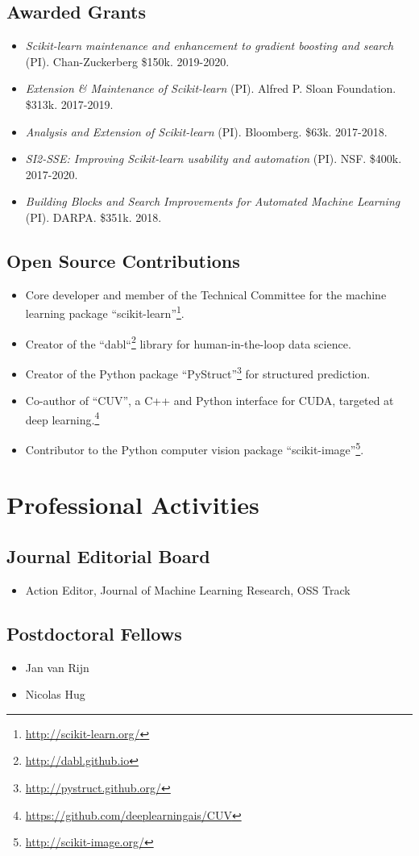 \documentclass[a4paper,9pt]{article}
\begin{document}
\subsection{Awarded Grants}
\begin{itemize}
    \item \emph{Scikit-learn maintenance and enhancement to gradient boosting and search} (PI). Chan-Zuckerberg \$150k. 2019-2020.
    \item \emph{Extension \& Maintenance of Scikit-learn} (PI). Alfred P. Sloan Foundation. \$313k. 2017-2019.
    \item \emph{Analysis and Extension of Scikit-learn} (PI). Bloomberg. \$63k. 2017-2018.
    \item \emph{SI2-SSE: Improving Scikit-learn usability and automation} (PI). NSF. \$400k. 2017-2020.
    \item \emph{Building Blocks and Search Improvements for Automated Machine Learning} (PI). DARPA. \$351k. 2018.
\end{itemize}

\subsection{Open Source Contributions}
\begin{itemize}
    \item Core developer and member of the Technical Committee for the machine learning package ``scikit-learn''\footnote{\url{http://scikit-learn.org/}}.
    \item Creator of the ``dabl``\footnote{\url{http://dabl.github.io}} library for human-in-the-loop data science.
    \item Creator of the Python package ``PyStruct''\footnote{\url{http://pystruct.github.org/}} for structured prediction.
    \item Co-author of ``CUV'', a C++ and Python interface for CUDA,
        targeted at deep learning.\footnote{\url{https://github.com/deeplearningais/CUV}}
    \item Contributor to the Python computer vision package ``scikit-image''\footnote{\url{http://scikit-image.org/}}.
\end{itemize}

\section{Professional Activities}
\subsection{Journal Editorial Board}
\begin{itemize}
    \item Action Editor, Journal of Machine Learning Research, OSS Track
\end{itemize}
\subsection{Postdoctoral Fellows}
\begin{itemize}
    \item Jan van Rijn
    \item Nicolas Hug
\end{itemize}
\begin{publications}
\end{publications}
\end{document}
